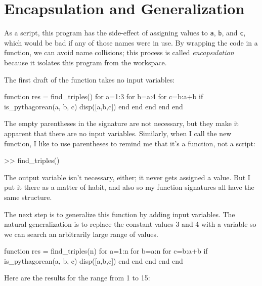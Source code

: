 \section{Encapsulation and Generalization}

As a script, this program has the side-effect of assigning values to
{\tt a}, {\tt b}, and {\tt c}, which would be bad if any of those names were in use.  
By wrapping the code in a function, we can avoid name collisions; this process is called {\em encapsulation} because it isolates this program from the workspace.


The first draft of the function takes no input variables:

\begin{code}
function res = find_triples()
    for a=1:3
        for b=a:4
            for c=b:a+b
                if is_pythagorean(a, b, c)
                    disp([a,b,c])
                end
            end
        end
    end
end
\end{code}

The empty parentheses in the signature are not necessary, but
they make it apparent that there are no input variables.  Similarly,
when I call the new function, I like to use parentheses to remind me
that it's a function, not a script:

\begin{code}
>> find_triples()
\end{code}

The output variable isn't necessary, either; it
never gets assigned a value.  But I put it there as a matter of
habit, and also so my function signatures all have the same structure.


The next step is to generalize this function by adding input
variables.  The natural generalization is to replace the constant
values 3 and 4 with a variable so we can search an arbitrarily large
range of values.

\begin{code}
function res = find_triples(n)
    for a=1:n
        for b=a:n
            for c=b:a+b
                if is_pythagorean(a, b, c)
                    disp([a,b,c])
                end
            end
        end
    end
end
\end{code}

Here are the results for the range from 1 to 15:


